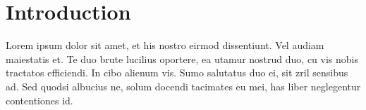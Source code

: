 \documentclass[11pt,article,oneside]{memoir}
\makeatletter
\def\myaffiliation{EPFL, Switzerland}
\def\myauthor{Heather Miller}
\def\myemail{\small{\texttt{\href{mailto:heather.miller@epfl.ch}{heather.miller@epfl.ch}}}}
\def\mytitle{Article Title}
\makeatother
\begin{document}
\setsansfont[Mapping=tex-text]{Minion Pro}



\pagestyle{kjh}

\title{\bigskip \bigskip {{\mytitle}}}

\author{\myauthor \\
  \emph{\myaffiliation} \\ \myemail}%

\date{{\scriptsize{\texttt{}}}}




\maketitle

\thispagestyle{kjhgit}

\begin{abstract}
  \textit{Abstract:} And consider this an abstract.
\end{abstract}

%

\section{Introduction}

Lorem ipsum dolor sit amet, et his nostro eirmod dissentiunt. Vel audiam
maiestatis et. Te duo brute lucilius oportere, ea utamur nostrud duo, cu vis
nobis tractatos efficiendi. In cibo alienum vis. Sumo salutatus duo ei, sit zril
sensibus ad. Sed quodsi albucius ne, solum docendi tacimates eu mei, has liber
neglegentur contentiones id.
\end{document}
